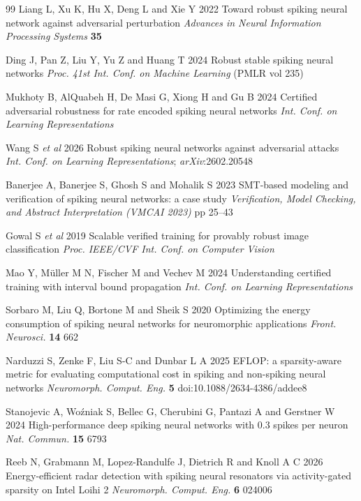 \documentclass{iopjournal}
\begin{document}
\begin{thebibliography}{99}
 Liang L, Xu K, Hu X, Deng L and Xie Y 2022 Toward robust spiking neural network against adversarial perturbation \textit{Advances in Neural Information Processing Systems} \textbf{35}

 Ding J, Pan Z, Liu Y, Yu Z and Huang T 2024 Robust stable spiking neural networks \textit{Proc. 41st Int. Conf. on Machine Learning} (PMLR vol 235)

 Mukhoty B, AlQuabeh H, De Masi G, Xiong H and Gu B 2024 Certified adversarial robustness for rate encoded spiking neural networks \textit{Int. Conf. on Learning Representations}

 Wang S \textit{et al} 2026 Robust spiking neural networks against adversarial attacks \textit{Int. Conf. on Learning Representations}; \textit{arXiv}:2602.20548

 Banerjee A, Banerjee S, Ghosh S and Mohalik S 2023 SMT-based modeling and verification of spiking neural networks: a case study \textit{Verification, Model Checking, and Abstract Interpretation (VMCAI 2023)} pp 25--43

 Gowal S \textit{et al} 2019 Scalable verified training for provably robust image classification \textit{Proc. IEEE/CVF Int. Conf. on Computer Vision}

 Mao Y, M\"uller M N, Fischer M and Vechev M 2024 Understanding certified training with interval bound propagation \textit{Int. Conf. on Learning Representations}

 Sorbaro M, Liu Q, Bortone M and Sheik S 2020 Optimizing the energy consumption of spiking neural networks for neuromorphic applications \textit{Front. Neurosci.} \textbf{14} 662

 Narduzzi S, Zenke F, Liu S-C and Dunbar L A 2025 EFLOP: a sparsity-aware metric for evaluating computational cost in spiking and non-spiking neural networks \textit{Neuromorph. Comput. Eng.} \textbf{5} doi:10.1088/2634-4386/addee8

 Stanojevic A, Wo\'zniak S, Bellec G, Cherubini G, Pantazi A and Gerstner W 2024 High-performance deep spiking neural networks with 0.3 spikes per neuron \textit{Nat. Commun.} \textbf{15} 6793

 Reeb N, Grabmann M, Lopez-Randulfe J, Dietrich R and Knoll A C 2026 Energy-efficient radar detection with spiking neural resonators via activity-gated sparsity on Intel Loihi 2 \textit{Neuromorph. Comput. Eng.} \textbf{6} 024006


\end{thebibliography}
\end{document}

